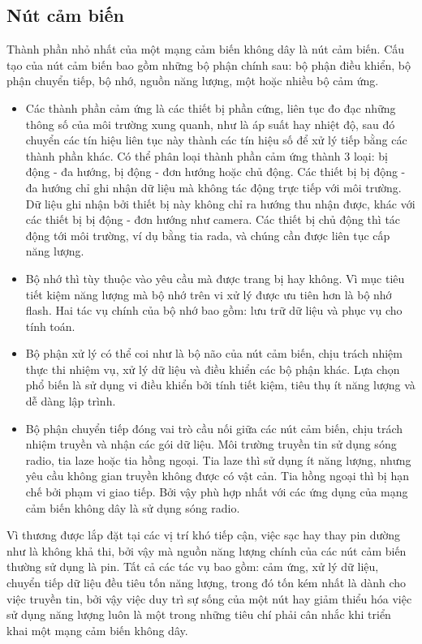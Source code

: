 \subsection{Nút cảm biến}
Thành phần nhỏ nhất của một mạng cảm biến không dây là nút cảm biến. Cấu tạo của nút cảm biến bao gồm những bộ phận chính sau: bộ phận điều khiển, bộ phận chuyển tiếp, bộ nhớ, nguồn năng lượng, một hoặc nhiều bộ cảm ứng.
\begin{itemize}
\item Các thành phần cảm ứng là các thiết bị phần cứng, liên tục đo đạc những thông số của môi trường xung quanh, như là áp suất hay nhiệt độ, sau đó chuyển các tín hiệu liên tục này thành các tín hiệu số để xử lý tiếp bằng các thành phần khác. Có thể phân loại thành phần cảm ứng thành 3 loại: bị động - đa hướng, bị động - đơn hướng hoặc chủ động. Các thiết bị bị động - đa hướng chỉ ghi nhận dữ liệu mà không tác động trực tiếp với môi trường. Dữ liệu ghi nhận bởi thiết bị này không chỉ ra hướng thu nhận được, khác với các thiết bị bị động - đơn hướng như camera. Các thiết bị chủ động thì tác động tới môi trường, ví dụ bằng tia rada, và chúng cần được liên tục cấp năng lượng.
\item Bộ nhớ thì tùy thuộc vào yêu cầu mà được trang bị hay không. Vì mục tiêu tiết kiệm năng lượng mà bộ nhớ trên vi xử lý được ưu tiên hơn là bộ nhớ flash. Hai tác vụ chính của bộ nhớ bao gồm: lưu trữ dữ liệu và phục vụ cho tính toán.
\item Bộ phận xử lý có thể coi như là bộ não của nút cảm biến, chịu trách nhiệm thực thi nhiệm vụ, xử lý dữ liệu và điều khiển các bộ phận khác. Lựa chọn phổ biến là sử dụng vi điều khiển bởi tính tiết kiệm, tiêu thụ ít năng lượng và dễ dàng lập trình.
\item Bộ phận chuyển tiếp đóng vai trò cầu nối giữa các nút cảm biến, chịu trách nhiệm truyền và nhận các gói dữ liệu. Môi trường truyền tin sử dụng sóng radio, tia laze hoặc tia hồng ngoại. Tia laze thì sử dụng ít năng lượng, nhưng yêu cầu không gian truyền không được có vật cản. Tia hồng ngoại thì bị hạn chế bởi phạm vi giao tiếp. Bởi vậy phù hợp nhất với các ứng dụng của mạng cảm biến không dây là sử dụng sóng radio.
\end{itemize}
Vì thương được lắp đặt tại các vị trí khó tiếp cận, việc sạc hay thay pin dường như là không khả thi, bởi vậy mà nguồn năng lượng chính của các nút cảm biến thường sử dụng là pin. Tất cả các tác vụ bao gồm: cảm ứng, xử lý dữ liệu, chuyển tiếp dữ liệu đều tiêu tốn năng lượng, trong đó tốn kém nhất là dành cho việc truyền tin, bởi vậy việc duy trì sự sống của một nút hay giảm thiểu hóa việc sử dụng năng lượng luôn là một trong những tiêu chí phải cân nhắc khi triển khai một mạng cảm biến không dây.

